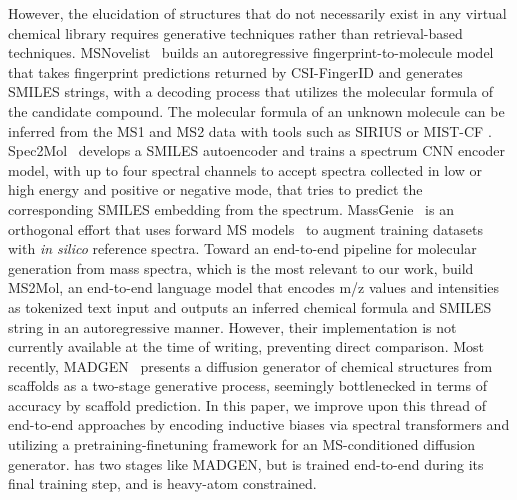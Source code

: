 However, the elucidation of structures that do not necessarily exist in any virtual chemical library requires generative techniques rather than retrieval-based techniques. MSNovelist~\citep{stravs2022msnovelist} builds an autoregressive fingerprint-to-molecule model that takes fingerprint predictions returned by CSI-FingerID and generates SMILES strings, with a decoding process that utilizes the molecular formula of the candidate compound. The molecular formula of an unknown molecule can be inferred from the MS1 and MS2 data with tools such as SIRIUS \cite{bocker2016fragmentation}
 or MIST-CF \cite{goldman2023mist-cf}. 
Spec2Mol~\citep{litsa2023spec2mol} develops a SMILES autoencoder and trains a spectrum CNN encoder model, with up to four spectral channels to accept spectra collected in low or high energy and positive or negative mode, that tries to predict the corresponding SMILES embedding from the spectrum. %
MassGenie~\citep{shrivastava2021massgenie} is an orthogonal effort that uses forward MS models~\citep{allen2015cfm-id,goldman2024iceberg} to augment training datasets with \emph{in silico} reference spectra.
Toward an end-to-end pipeline for molecular generation from mass spectra, which is the most relevant to our work, \citet{butler2023ms2mol} build MS2Mol, an end-to-end language model that encodes m/z values and intensities as tokenized text input and outputs an inferred chemical formula and SMILES string in an autoregressive manner. However, their implementation is not currently available at the time of writing, preventing direct comparison. Most recently, MADGEN~\citep{wang2025madgenmassspecattendsnovo} presents a diffusion generator of chemical structures from scaffolds as a two-stage generative process, seemingly bottlenecked in terms of accuracy by scaffold prediction. 
In this paper, we improve upon this thread of end-to-end approaches by encoding inductive biases via spectral transformers and utilizing a pretraining-finetuning framework for an MS-conditioned diffusion generator. \ours has two stages like MADGEN, but is trained end-to-end during its final training step, and is heavy-atom constrained.




